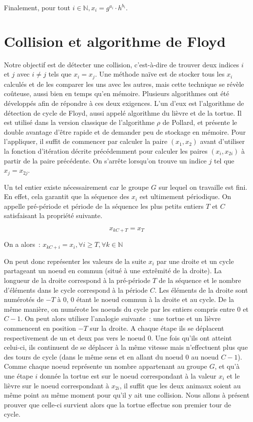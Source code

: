         Finalement, pour tout $i \in \mathbb{N}, x_i = g^{a_i} \cdot h^{b_i}$.

        \section{Collision et algorithme de Floyd}
        \label{chapter1:Floyd}
        Notre objectif est de détecter une collision, c'est-à-dire de trouver deux indices $i$ et $j$ avec $i \ne j$ tels que $x_i = x_j$. Une méthode naïve est de stocker tous les $x_i$ calculés et de les comparer les uns avec les autres, mais cette technique se révèle coûteuse, aussi bien en temps qu'en mémoire. Plusieurs algorithmes ont été développés afin de répondre à ces deux exigences. L'un d'eux est l'algorithme de détection de cycle de Floyd, aussi appelé algorithme du lièvre et de la tortue. Il est utilisé dans la version classique de l'algorithme \texorpdfstring{$\rho$}{Rho} de Pollard, et présente le double avantage d'être rapide et de demander peu de stockage en mémoire. Pour l'appliquer, il suffit de commencer par calculer la paire $(x_1, x_2)$ avant d'utiliser la fonction d'itération décrite précédemment pour calculer les paires $(x_i, x_{2i})$ à partir de la paire précédente. On s'arrête lorsqu'on trouve un indice $j$ tel que $x_j = x_{2j}$.

        Un tel entier existe nécessairement car le groupe $G$ sur lequel on travaille est fini. En effet, cela garantit que la séquence des $x_i$ est ultimement périodique. On appelle pré-période et période de la séquence les plus petits entiers $T$ et $C$ satisfaisant la propriété suivante.

        \[ x_{kC+T} = x_T \]

        On a alors~: $ x_{kC+i} = x_i, \forall i \ge T, \forall k \in \mathbb{N}$

        On peut donc représenter les valeurs de la suite $x_i$ par une droite et un cycle partageant un noeud en commun (situé à une extrêmité de la droite). La longueur de la droite correspond à la pré-période $T$ de la séquence et le nombre d'éléments dans le cycle correspond à la période $C$. Les éléments de la droite sont numérotés de $-T$ à $0$, $0$ étant le noeud commun à la droite et au cycle. De la même manière, on numérote les noeuds du cycle par les entiers compris entre $0$ et $C-1$. On peut alors utiliser l'analogie suivante~: une tortue et un lièvre commencent en position $-T$ sur la droite. A chaque étape ils se déplacent respectivement de un et deux pas vers le noeud $0$. Une fois qu'ils ont atteint celui-ci, ils continuent de se déplacer à la même vitesse mais n'effectuent plus que des tours de cycle (dans le même sens et en allant du noeud $0$ au noeud $C-1$). Comme chaque noeud représente un nombre appartenant au groupe $G$, et qu'à une étape $i$ donnée la tortue est sur le noeud correspondant à la valeur $x_i$ et le lièvre sur le noeud correspondant à $x_{2i}$, il suffit que les deux animaux soient au même point au même moment pour qu'il y ait une collision. Nous allons à présent prouver que celle-ci survient alors que la tortue effectue son premier tour de cycle.

